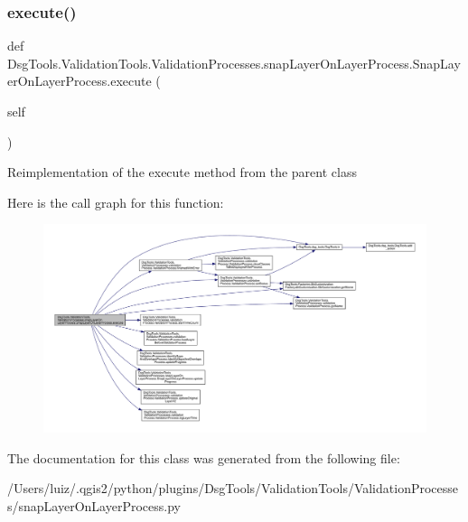 \subsubsection{\texorpdfstring{execute()}{execute()}}
{\footnotesize\ttfamily def Dsg\+Tools.\+Validation\+Tools.\+Validation\+Processes.\+snap\+Layer\+On\+Layer\+Process.\+Snap\+Layer\+On\+Layer\+Process.\+execute (\begin{DoxyParamCaption}\item[{}]{self }\end{DoxyParamCaption})}

\begin{DoxyVerb}Reimplementation of the execute method from the parent class
\end{DoxyVerb}
 Here is the call graph for this function\+:
\nopagebreak
\begin{figure}[H]
\begin{center}
\leavevmode
\includegraphics[width=350pt]{class_dsg_tools_1_1_validation_tools_1_1_validation_processes_1_1snap_layer_on_layer_process_1_1_snap_layer_on_layer_process_a8a70ec076ee34807daa0aadfc6340d92_cgraph}
\end{center}
\end{figure}


The documentation for this class was generated from the following file\+:\begin{DoxyCompactItemize}
\item 
/\+Users/luiz/.\+qgis2/python/plugins/\+Dsg\+Tools/\+Validation\+Tools/\+Validation\+Processes/snap\+Layer\+On\+Layer\+Process.\+py\end{DoxyCompactItemize}
